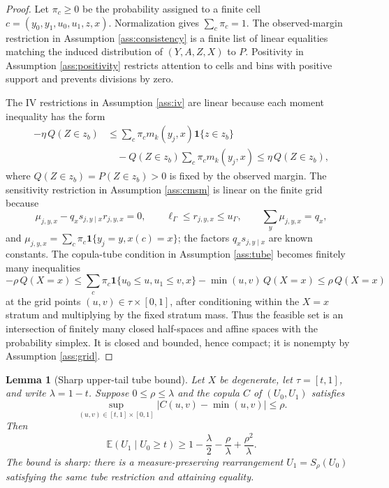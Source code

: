 \documentclass[11pt]{article}
\newcommand{\E}{\mathbb{E}}
\newcommand{\one}{\mathbf{1}}
\theoremstyle{definition}
\theoremstyle{plain}
\newtheorem{lemma}{Lemma}
\theoremstyle{remark}
\begin{document}
\begin{proof}
Let \(\pi_c\ge0\) be the probability assigned to a finite cell \(c=(y_0,y_1,u_0,u_1,z,x)\).  Normalization gives \(\sum_c\pi_c=1\).  The observed-margin restriction in Assumption \ref{ass:consistency} is a finite list of linear equalities matching the induced distribution of \((Y,A,Z,X)\) to \(P\).  Positivity in Assumption \ref{ass:positivity} restricts attention to cells and bins with positive support and prevents divisions by zero.

The IV restrictions in Assumption \ref{ass:iv} are linear because each moment inequality has the form
\[
\begin{aligned}
-\eta\,Q(Z\in z_b)
&\le
\sum_c \pi_c m_k(y_j,x)\one\{z\in z_b\}\\
&\quad
-Q(Z\in z_b)\sum_c\pi_c m_k(y_j,x)
\le
\eta\,Q(Z\in z_b),
\end{aligned}
\]
where \(Q(Z\in z_b)=P(Z\in z_b)>0\) is fixed by the observed margin.  The sensitivity restriction in Assumption \ref{ass:cmsm} is linear on the finite grid because
\[
\mu_{j,y,x}-q_xs_{j,y\mid x}r_{j,y,x}=0,\qquad
\ell_\Gamma\le r_{j,y,x}\le u_\Gamma,\qquad
\sum_y\mu_{j,y,x}=q_x,
\]
and \(\mu_{j,y,x}=\sum_c\pi_c\one\{y_j=y,x(c)=x\}\); the factors \(q_xs_{j,y\mid x}\) are known constants.  The copula-tube condition in Assumption \ref{ass:tube} becomes finitely many inequalities
\[
-\rho\,Q(X=x)\le
\sum_c \pi_c\one\{u_0\le u,u_1\le v,x\}
-\min(u,v)\,Q(X=x)
\le \rho\,Q(X=x)
\]
at the grid points \((u,v)\in\tau\times[0,1]\), after conditioning within the \(X=x\) stratum and multiplying by the fixed stratum mass.  Thus the feasible set is an intersection of finitely many closed half-spaces and affine spaces with the probability simplex.  It is closed and bounded, hence compact; it is nonempty by Assumption \ref{ass:grid}.
\end{proof}

\begin{lemma}[Sharp upper-tail tube bound]\label{lem:tube-tail}
Let \(X\) be degenerate, let \(\tau=[t,1]\), and write \(\lambda=1-t\).  Suppose \(0\le\rho\le\lambda\) and the copula \(C\) of \((U_0,U_1)\) satisfies
\[
\sup_{(u,v)\in[t,1]\times[0,1]}|C(u,v)-\min(u,v)|\le\rho.
\]
Then
\[
\E(U_1\mid U_0\ge t)\ge
1-\frac{\lambda}{2}-\frac{\rho}{\lambda}+\frac{\rho^2}{\lambda}.
\]
The bound is sharp: there is a measure-preserving rearrangement \(U_1=S_\rho(U_0)\) satisfying the same tube restriction and attaining equality.
\end{lemma}
\end{document}
